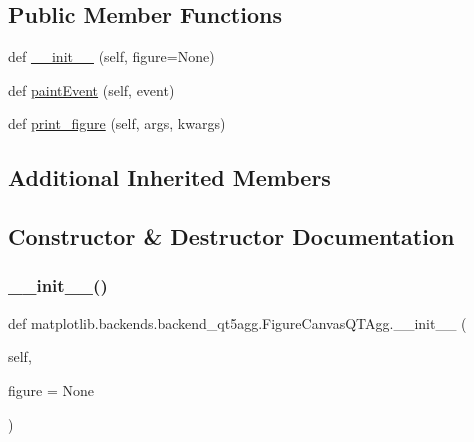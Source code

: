 \subsection*{Public Member Functions}
\begin{DoxyCompactItemize}
\item 
def \hyperlink{classmatplotlib_1_1backends_1_1backend__qt5agg_1_1FigureCanvasQTAgg_ae378a2ce000212ffe5bc676668787eb1}{\+\_\+\+\_\+init\+\_\+\+\_\+} (self, figure=None)
\item 
def \hyperlink{classmatplotlib_1_1backends_1_1backend__qt5agg_1_1FigureCanvasQTAgg_af6837fb7b6786b26090d4add28c38607}{paint\+Event} (self, event)
\item 
def \hyperlink{classmatplotlib_1_1backends_1_1backend__qt5agg_1_1FigureCanvasQTAgg_a6236255623940acb2e35807720f8b6fd}{print\+\_\+figure} (self, args, kwargs)
\end{DoxyCompactItemize}
\subsection*{Additional Inherited Members}


\subsection{Constructor \& Destructor Documentation}
\mbox{\label{classmatplotlib_1_1backends_1_1backend__qt5agg_1_1FigureCanvasQTAgg_ae378a2ce000212ffe5bc676668787eb1}} 
\subsubsection{\texorpdfstring{\+\_\+\+\_\+init\+\_\+\+\_\+()}{\_\_init\_\_()}}
{\footnotesize\ttfamily def matplotlib.\+backends.\+backend\+\_\+qt5agg.\+Figure\+Canvas\+Q\+T\+Agg.\+\_\+\+\_\+init\+\_\+\+\_\+ (\begin{DoxyParamCaption}\item[{}]{self,  }\item[{}]{figure = {\ttfamily None} }\end{DoxyParamCaption})}



